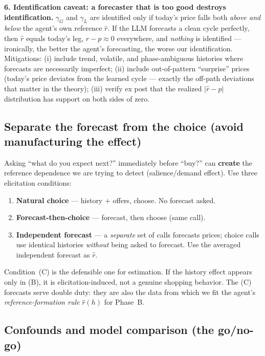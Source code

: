 \documentclass[11pt]{article}
\newcommand{\crit}[1]{\textcolor{crit}{\textbf{#1}}}
\begin{document}
\smallskip
\textbf{6. Identification caveat: a forecaster that is too good destroys identification.} $\gamma_G$ and
$\gamma_L$ are identified only if today's price falls both \emph{above and below} the agent's own reference
$\hat r$. If the LLM forecasts a clean cycle perfectly, then $\hat r$ equals today's leg, $r-p\approx0$
everywhere, and \emph{nothing} is identified --- ironically, the better the agent's forecasting, the worse
our identification. Mitigations: (i) include trend, volatile, and phase-ambiguous histories where forecasts
are necessarily imperfect; (ii) include out-of-pattern ``surprise'' prices (today's price deviates from the
learned cycle --- exactly the off-path deviations that matter in the theory); (iii) verify ex post that the
realized $|\hat r - p|$ distribution has support on both sides of zero.

\subsection*{Separate the forecast from the choice (avoid manufacturing the effect)}

Asking ``what do you expect next?'' immediately before ``buy?'' can \crit{create} the reference dependence
we are trying to detect (salience/demand effect). Use three elicitation conditions:
\begin{enumerate}[label=(\Alph*)]
  \item \textbf{Natural choice} --- history $+$ offers, choose. No forecast asked.
  \item \textbf{Forecast-then-choice} --- forecast, then choose (same call).
  \item \textbf{Independent forecast} --- a \emph{separate} set of calls forecasts prices; choice calls use
        identical histories \emph{without} being asked to forecast. Use the averaged independent forecast
        as $\hat r$.
\end{enumerate}
Condition~(C) is the defensible one for estimation. If the history effect appears only in (B), it is
elicitation-induced, not a genuine shopping behavior. The (C) forecasts serve double duty: they are also
the data from which we fit the agent's \emph{reference-formation rule} $\hat r(h)$ for Phase~B.

\subsection*{Confounds and model comparison (the go/no-go)}
\end{document}
